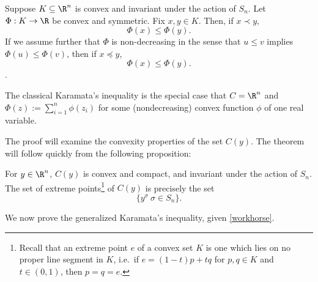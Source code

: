\documentclass[12pt]{amsart}
\begin{document}
\begin{thm}\label{GKI}Suppose $K \subseteq \R^n$ is convex and invariant under the action of $S_n$. Let $\Phi:K \to \R$ be convex and symmetric. Fix $x,y \in K$. Then, if $x \prec y$,
\[\Phi(x) \leq \Phi(y).\]
If we assume further that $\Phi$ is non-decreasing in the sense that $u \leq v$ implies $\Phi(u) \leq \Phi(v)$, then if $x \preccurlyeq y$,
\[\Phi(x) \leq \Phi(y).\].\end{thm}
\begin{rk}The classical Karamata's inequality is the special case that $C = \R^n$ and $\Phi(z) := \sum_{i=1}^n \phi(z_i)$ for some (nondecreasing) convex function $\phi$ of one real variable.\end{rk}
The proof will examine the convexity properties of the set $C(y)$. The theorem will follow quickly from the following proposition:
\begin{prop}\label{workhorse}For $y \in\R^n$, $C(y)$ is convex and compact, and invariant under the action of $S_n$. The set of extreme points\footnote{Recall that an extreme point $e$ of a convex set $K$ is one which lies on no proper line segment in $K$, i.e.\ if $e = (1-t)p + tq$ for $p,q\in K$ and $t \in (0,1)$, then $p = q = e$.} of $C(y)$ is precisely the set
\[\{y^\sigma \: \sigma \in S_n\}.\]\end{prop}
We now prove the generalized Karamata's inequality, given \cref{workhorse}.
\end{document}
